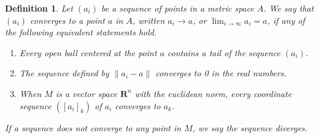 \documentclass[12pt]{amsbook}
\theoremstyle{plain}
\newtheorem{definition}{Definition}
\theoremstyle{definition}
\begin{document}
\begin{definition}
  Let $(a_i)$ be a sequence of points in a metric space $A$. We say that $(a_i)$ converges to a point $a$ in $A$, written $a_i \to a$, or $\lim_{i \to \infty} a_i = a$, if any of the following equivalent statements hold.
  \begin{enumerate}
    \item Every open ball centered at the point $a$ contains a tail of the sequence $(a_i)$.
    \item The sequence defined by $\| a_i - a \|$ converges to 0 in the real numbers.
    \item When $M$ is a vector space $\mathbf{R}^n$ with the euclidean norm, every coordinate sequence $([a_i]_k)$ of $a_i$ converges to $a_k$.
  \end{enumerate}
  If a sequence does not converge to any point in $M$, we say the sequence diverges.
\end{definition}
\end{document}

